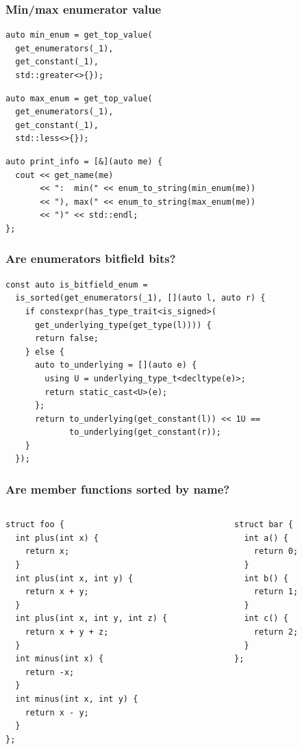 \documentclass[compress,table,xcolor=table]{beamer}
\begin{document}
\begin{frame}[fragile]
  \frametitle{Min/max enumerator value}
  \begin{lstlisting}[language=c++2x,basicstyle=\footnotesize\ttfamily]
auto min_enum = get_top_value(
  get_enumerators(_1),
  get_constant(_1),
  std::greater<>{});
  \end{lstlisting}
  \vfill
  \begin{lstlisting}[language=c++2x,basicstyle=\footnotesize\ttfamily]
auto max_enum = get_top_value(
  get_enumerators(_1),
  get_constant(_1),
  std::less<>{});
  \end{lstlisting}
  \vfill
  \begin{lstlisting}[language=c++2x,basicstyle=\footnotesize\ttfamily]
auto print_info = [&](auto me) {
  cout << get_name(me)
       << ":  min(" << enum_to_string(min_enum(me))
       << "), max(" << enum_to_string(max_enum(me))
       << ")" << std::endl;
};
  \end{lstlisting}
\end{frame}
\begin{frame}[fragile]
  \frametitle{Are enumerators bitfield bits?}
  \begin{lstlisting}[language=c++2x,basicstyle=\footnotesize\ttfamily]
const auto is_bitfield_enum =
  is_sorted(get_enumerators(_1), [](auto l, auto r) {
    if constexpr(has_type_trait<is_signed>(
      get_underlying_type(get_type(l)))) {
      return false;
    } else {
      auto to_underlying = [](auto e) {
        using U = underlying_type_t<decltype(e)>;
        return static_cast<U>(e);
      };
      return to_underlying(get_constant(l)) << 1U ==
             to_underlying(get_constant(r));
    }
  });
  \end{lstlisting}
\end{frame}
\begin{frame}[fragile]
  \frametitle{Are member functions sorted by name?}
  \begin{columns}
    \begin{column}{.65\textwidth}
      \begin{lstlisting}[language=c++2x,basicstyle=\footnotesize\ttfamily]
struct foo {
  int plus(int x) {
    return x;
  }
  int plus(int x, int y) {
    return x + y;
  }
  int plus(int x, int y, int z) {
    return x + y + z;
  }
  int minus(int x) {
    return -x;
  }
  int minus(int x, int y) {
    return x - y;
  }
};
      \end{lstlisting}
    \end{column}
    \begin{column}{.35\textwidth}
      \begin{lstlisting}[language=c++2x,basicstyle=\small\ttfamily]
struct bar {
  int a() {
    return 0;
  }
  int b() {
    return 1;
  }
  int c() {
    return 2;
  }
};
      \end{lstlisting}
    \end{column}
  \end{columns}
\end{frame}
\end{document}
